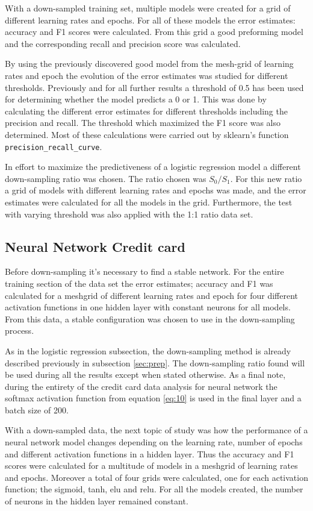 \documentclass[uio,jmp,amsmath,amssymb,reprint,nofootinbib]{revtex4-1}
\numberwithin{equation}{section}
\begin{document}
With a down-sampled training set, multiple models were created for a grid of different learning rates and epochs. For all of these models the error estimates: accuracy and F1 scores were calculated. From this grid a good preforming model and the corresponding recall and precision score was calculated.

By using the previously discovered good model from the mesh-grid of learning rates and epoch the evolution of the error estimates was studied for different thresholds. Previously and for all further results a threshold of 0.5 has been used for determining whether the model predicts a 0 or 1. This was done by calculating the different error estimates for different thresholds including the precision and recall. The threshold which maximized the F1 score was also determined. Most of these calculations were carried out by sklearn's function \texttt{precision\_recall\_curve}.

In effort to maximize the predictiveness of a logistic regression model a different down-sampling ratio was chosen. The ratio chosen was \(S_0/S_1\). For this new ratio a grid of models with different learning rates and epochs was made, and the error estimates were calculated for all the models in the grid. Furthermore, the test with varying threshold was also applied with the 1:1 ratio data set.

\subsection{Neural Network Credit card}

Before down-sampling it's necessary to find a stable network. For the entire training section of the data set the error estimates; accuracy and F1 was calculated for a meshgrid of different learning rates and epoch for four different activation functions in one hidden layer with constant neurons for all models. From this data, a stable configuration  was chosen to use in the down-sampling process.

As in the logistic regression subsection, the down-sampling method is already described previously in subsection \ref{sec:prep}. The down-sampling ratio found will be used during all the results except when stated otherwise. As a final note, during the entirety of the credit card data analysis for neural network the softmax activation function from equation \ref{eq:10} is used in the final layer and a batch size of 200.

With a down-sampled data, the next topic of study was how the performance of a neural network model changes depending on the learning rate, number of epochs and different activation functions in a hidden layer. Thus the accuracy and F1 scores were calculated for a multitude of models in a meshgrid of learning rates and epochs. Moreover a total of four grids were calculated, one for each activation function; the sigmoid, tanh, elu and relu. For all the models created, the number of neurons in the hidden layer remained constant.
\end{document}
